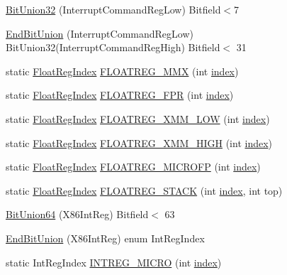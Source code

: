 \begin{DoxyCompactItemize}
\item 
\hyperlink{namespaceX86ISA_a1c8b28eb3a1018e40f0dce9c3fcd7b39}{BitUnion32} (InterruptCommandRegLow) Bitfield$<$7
\item 
\hyperlink{namespaceX86ISA_a269890a6e5fc8ed9f9d9da9aae67dbdd}{EndBitUnion} (InterruptCommandRegLow) BitUnion32(InterruptCommandRegHigh) Bitfield$<$ 31
\item 
static \hyperlink{namespaceX86ISA_a50e93c80b4d3e47dea8b60bf4b9a4f77}{FloatRegIndex} \hyperlink{namespaceX86ISA_a4fd5045f1ab1c921edbf999a7452de9c}{FLOATREG\_\-MMX} (int \hyperlink{namespaceX86ISA_aa7f971ede8ba06dbd8a605007eda1c6f}{index})
\item 
static \hyperlink{namespaceX86ISA_a50e93c80b4d3e47dea8b60bf4b9a4f77}{FloatRegIndex} \hyperlink{namespaceX86ISA_ab07809fafe3d56bd3789c7ada8139259}{FLOATREG\_\-FPR} (int \hyperlink{namespaceX86ISA_aa7f971ede8ba06dbd8a605007eda1c6f}{index})
\item 
static \hyperlink{namespaceX86ISA_a50e93c80b4d3e47dea8b60bf4b9a4f77}{FloatRegIndex} \hyperlink{namespaceX86ISA_a7e1716adfb57ca8bf4794517d887ea54}{FLOATREG\_\-XMM\_\-LOW} (int \hyperlink{namespaceX86ISA_aa7f971ede8ba06dbd8a605007eda1c6f}{index})
\item 
static \hyperlink{namespaceX86ISA_a50e93c80b4d3e47dea8b60bf4b9a4f77}{FloatRegIndex} \hyperlink{namespaceX86ISA_ac68f196980acc04ce2279fb376e1401b}{FLOATREG\_\-XMM\_\-HIGH} (int \hyperlink{namespaceX86ISA_aa7f971ede8ba06dbd8a605007eda1c6f}{index})
\item 
static \hyperlink{namespaceX86ISA_a50e93c80b4d3e47dea8b60bf4b9a4f77}{FloatRegIndex} \hyperlink{namespaceX86ISA_af84bb6b9b85a3b7d663b92d1a968f81b}{FLOATREG\_\-MICROFP} (int \hyperlink{namespaceX86ISA_aa7f971ede8ba06dbd8a605007eda1c6f}{index})
\item 
static \hyperlink{namespaceX86ISA_a50e93c80b4d3e47dea8b60bf4b9a4f77}{FloatRegIndex} \hyperlink{namespaceX86ISA_aa7d52d6d8aa711d769c4fbee2fcd578a}{FLOATREG\_\-STACK} (int \hyperlink{namespaceX86ISA_aa7f971ede8ba06dbd8a605007eda1c6f}{index}, int top)
\item 
\hyperlink{namespaceX86ISA_a10715f66efb544706934aad138792efd}{BitUnion64} (X86IntReg) Bitfield$<$ 63
\item 
\hyperlink{namespaceX86ISA_ad59b56d2c756ba2c3ed73fda3a246a3a}{EndBitUnion} (X86IntReg) enum IntRegIndex
\item 
static IntRegIndex \hyperlink{namespaceX86ISA_a8bb7e419ce07ff5a21dd4fc4a9f62dad}{INTREG\_\-MICRO} (int \hyperlink{namespaceX86ISA_aa7f971ede8ba06dbd8a605007eda1c6f}{index})

\end{DoxyCompactItemize}
